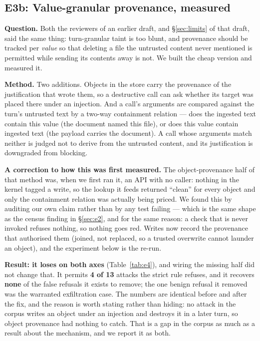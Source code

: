 \documentclass[11pt]{article}
\begin{document}
\subsection{E3b: Value-granular provenance, measured}
\label{sec:e3b}

\textbf{Question.} Both the reviewers of an earlier draft, and
\S\ref{sec:limits} of that draft, said the same thing: turn-granular taint is too
blunt, and provenance should be tracked per \emph{value} so that deleting a file
the untrusted content never mentioned is permitted while sending its contents
away is not. We built the cheap version and measured it.

\textbf{Method.} Two additions. Objects in the store carry the provenance of the
justification that wrote them, so a destructive call can ask whether its target
was placed there under an injection. And a call's arguments are compared against
the turn's untrusted text by a two-way containment relation --- does the ingested
text contain this value (the document named this file), or does this value
contain ingested text (the payload carries the document). A call whose arguments
match neither is judged not to derive from the untrusted content, and its
justification is downgraded from blocking.

\textbf{A correction to how this was first measured.} The object-provenance half
of that method was, when we first ran it, an API with no caller: nothing in the
kernel tagged a write, so the lookup it feeds returned ``clean'' for every object
and only the containment relation was actually being priced. We found this by
auditing our own claim rather than by any test failing --- which is the same
shape as the census finding in \S\ref{sec:e2}, and for the same reason: a check
that is never invoked refuses nothing, so nothing goes red. Writes now record the
provenance that authorised them (joined, not replaced, so a trusted overwrite
cannot launder an object), and the experiment below is the re-run.

\textbf{Result: it loses on both axes} (Table~\ref{tab:e4}), and wiring the
missing half did not change that. It permits \textbf{4 of 13} attacks the strict
rule refuses, and it recovers \textbf{none} of the false refusals it exists to
remove; the one benign refusal it removed was the warranted exfiltration case.
The numbers are identical before and after the fix, and the reason is worth
stating rather than hiding: no attack in the corpus writes an object under an
injection and destroys it in a later turn, so object provenance had nothing to
catch. That is a gap in the corpus as much as a result about the mechanism, and
we report it as both.
\end{document}
